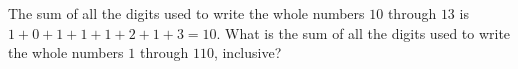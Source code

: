 The sum of all the digits used to write the whole numbers $10$ through $13$ is $1+0+1+1+1+2+1+3=10$. What is the sum of all the digits used to write the whole numbers $1$ through $110$, inclusive?
